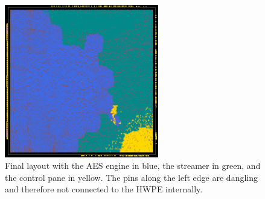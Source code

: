 \documentclass[a4paper, 12pt]{article}
\begin{document}
\begin{figure} [h]
	\centering
	\includegraphics[width=0.6\textwidth]{layout.png}
	\caption{Final layout with the AES engine in blue, the streamer in green, and the control pane in yellow. The pins along the left edge are dangling and therefore not connected to the HWPE internally.}
	\label{fig:layout}
\end{figure} 
\end{document}
